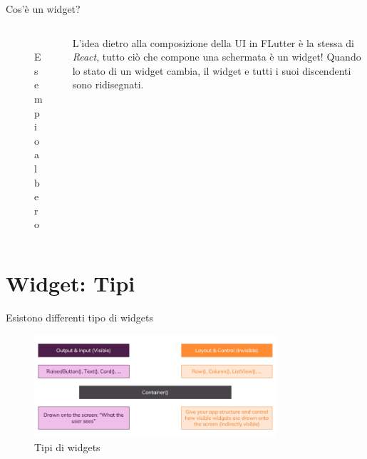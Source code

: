 \documentclass{../libs/presentation_format}
\begin{document}
\begin{frame}{Cos'è un widget?}
	\begin{minipage}[0.2\textheight]{\textwidth}
		\begin{columns}[T]
			\begin{column}{0.4\textwidth}
				\begin{figure}[htpb]
					\centering
					\includegraphics[width=4cm]{../libs/sample-flutter-layout}
					\caption{Esempio albero \cite{flutterLayout}}
					\label{fig:Esempio albero}
				\end{figure}
			\end{column}
			\begin{column}{0.6\textwidth}
				L'idea dietro alla composizione della UI in FLutter è la stessa di \emph{React},
				tutto ciò che compone una schermata è un widget!
				Quando lo stato di un widget cambia, il widget e tutti i suoi discendenti sono ridisegnati.
			\end{column}
		\end{columns}
	\end{minipage}
\end{frame}


\section{Widget: Tipi}
\begin{frame}{Esistono differenti tipo di widgets}
	\begin{figure}[htpb]
		\centering
		\includegraphics[width=9cm]{../libs/widget-types.png}
		\caption{Tipi di widgets}
		\label{fig: Tipi di widgets}
	\end{figure}
\end{frame}
\end{document}
